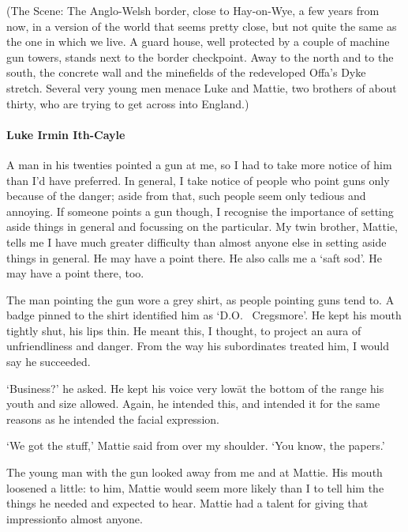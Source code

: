 
(The Scene: The Anglo-Welsh border, close to Hay-on-Wye, a few years
from now, in a version of the world that seems pretty close, but not
quite the same as the one in which we live.  A guard house, well
protected by a couple of machine gun towers, stands next to the border
checkpoint.  Away to the north and to the south, the concrete wall and
the minefields of the redeveloped Offa’s Dyke stretch.  Several very
young men menace Luke and Mattie, two brothers of about thirty, who
are trying to get across into England.)

\prelude

\paragraph{Luke Irmin Ith-Cayle}\strut

A man in his twenties pointed a gun at me, so I had to take more
notice of him than I’d have preferred.  In general, I take notice of
people who point guns only because of the danger; aside from that,
such people seem only tedious and annoying.  If someone points a gun
though, I recognise the importance of setting aside things in general
and focussing on the particular.  My twin brother, Mattie, tells me I
have much greater difficulty than almost anyone else in setting aside
things in general.  He may have a point there.  He also calls me a
‘saft sod’.  He may have a point there, too.

The man pointing the gun wore a grey shirt, as people pointing guns
tend to.  %
A badge pinned to the shirt identified him as ‘D.O.~%
Cregsmore’.  He kept his mouth tightly shut, his lips thin.  He meant
this, I thought, to project an aura of unfriendliness and danger.
From the way his subordinates treated him, I would say he succeeded.

‘Business?’ he asked.  He kept his voice very low\=at the bottom of
the range his youth and size allowed.  Again, he intended this,
and intended it for the same reasons as he intended the facial
expression.

‘We got the stuff,’ Mattie said from over my shoulder.  ‘You know, the
papers.’

The young man with the gun looked away from me and at Mattie.  His
mouth loosened a little: to him, Mattie would seem more likely than I
to tell him the things he needed and expected to hear.  Mattie had a
talent for giving that impression\=to almost anyone.

